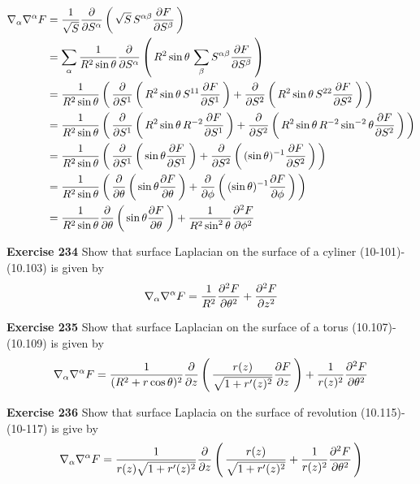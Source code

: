\documentclass[12pt,a4paper]{report}
\newcommand{\BLUE}[1]{\textcolor{blue}{#1}}
\begin{document}
\begin{description}
\BLUE{\begin{align*}
	\nabla_\alpha\nabla^\alpha F &= \frac{1}{\sqrt{S}}\frac{\partial }{\partial S^\alpha}\left (\, \sqrt{S}\,S^{\alpha\beta}\frac{\partial F}{\partial S^\beta} \,\right )\\
	&= \sum_\alpha \frac{1}{R^2\sin\theta}\frac{\partial }{\partial S^\alpha}\left (\, R^2\sin\theta\,\sum_\beta S^{\alpha\beta}\frac{\partial F}{\partial S^\beta} \,\right ) \\
	&= \frac{1}{R^2\sin\theta}\left (\, \frac{\partial }{\partial S^1}\left (\, R^2\sin\theta\,S^{11}\frac{\partial F}{\partial S^1} \,\right )+\frac{\partial }{\partial S^2}\left (\, R^2\sin\theta\, S^{22}\frac{\partial F}{\partial S^2} \,\right ) \,\right ) \\
	&= \frac{1}{R^2\sin\theta}\left (\, \frac{\partial }{\partial S^1}\left (\, R^2\sin\theta\,R^{-2}\frac{\partial F}{\partial S^1} \,\right )+\frac{\partial }{\partial S^2}\left (\, R^2\sin\theta\, R^{-2}\sin^{-2}\theta\frac{\partial F}{\partial S^2} \,\right ) \,\right ) \\
	&= \frac{1}{R^2\sin\theta}\left (\, \frac{\partial }{\partial S^1}\left (\, \sin\theta\frac{\partial F}{\partial S^1} \,\right )+\frac{\partial }{\partial S^2}\left (\, (\sin\theta)^{-1}\frac{\partial F}{\partial S^2} \,\right ) \,\right ) \\
	&= \frac{1}{R^2\sin\theta}\left (\, \frac{\partial }{\partial \theta}\left (\, \sin\theta\frac{\partial F}{\partial \theta} \,\right )+\frac{\partial }{\partial \phi}\left (\, (\sin\theta)^{-1}\frac{\partial F}{\partial \phi} \,\right ) \,\right ) \\
	&= \frac{1}{R^2\sin\theta}\frac{\partial }{\partial \theta}\left (\, \sin\theta\frac{\partial F}{\partial \theta} \,\right )+\frac{1}{R^2\sin^2\theta}\frac{\partial^2 F}{\partial \phi^2} \\
\end{align*}
}

\item \textbf{Exercise 234} Show that surface Laplacian on the surface of a cyliner (10-101)-(10.103) is given by
\begin{align*}
	\nabla_\alpha\nabla^\alpha F = \frac{1}{R^2}\frac{\partial^2 F}{\partial \theta^2}+\frac{\partial^2 F}{\partial z^2}
\end{align*}
\item \textbf{Exercise 235} Show that surface Laplacian on the surface of a torus (10.107)-(10.109) is given by
\begin{align*}
	\nabla_\alpha\nabla^\alpha F = \frac{1}{(R^2+r\cos\theta)^2}\frac{\partial }{\partial z}\left (\, \frac{r(z)}{\sqrt{1+r'(z)^2}}\frac{\partial F}{\partial z} \,\right )+\frac{1}{r(z)^2}\frac{\partial^2 F}{\partial \theta^2}
\end{align*}
\item \textbf{Exercise 236}  Show that surface Laplacia on the surface of revolution (10.115)-(10-117) is give by 
\begin{align*}
	\nabla_\alpha\nabla^\alpha F = \frac{1}{r(z)\sqrt{1+r'(z)^2}}\frac{\partial }{\partial z}\left (\, \frac{r(z)}{\sqrt{1+r'(z)^2}}+\frac{1}{r(z)^2}\frac{\partial^2 F}{\partial \theta^2} \,\right )
\end{align*}

\end{description}
\end{document}
